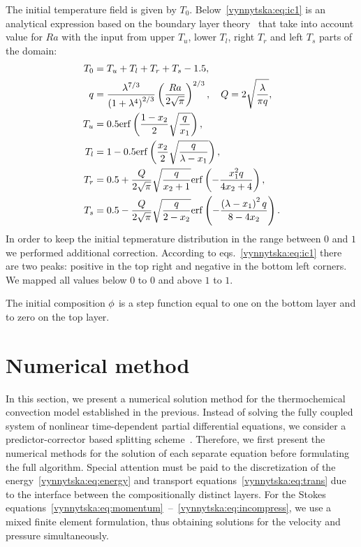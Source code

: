 The initial temperature field is given by $T_0$.
Below~\eqref{vynnytska:eq:ic1} is an analytical expression based on
the boundary layer theory~\citep{KekenEtAl1997} that take into account
value for $Ra$ with the input from upper $T_u$, lower $T_l$, right
$T_r$ and left $T_s$ parts of the domain:
\begin{subequations}
  \label{vynnytska:eq:ic1}
  \begin{align}
    T_0 &= T_u + T_l + T_r + T_s - 1.5, \\
    q &= \frac{\lambda^{7/3}}{\left(1 + \lambda^4 \right)^{2/3}} \left( \frac{Ra}{2 \sqrt{\pi}}\right)^{2/3}, \quad Q  = 2\sqrt{\frac{\lambda}{\pi q}},   \\
    T_u &= 0.5 \mathrm{erf} \left( \frac{1-x_2}{2} \sqrt{\frac{q}{x_1}  } \right), \\
    T_l &= 1 - 0.5 \mathrm{erf} \left( \frac{x_2}{2} \sqrt{\frac{q}{\lambda - x_1}  } \right), \\
    T_r &= 0.5 + \frac{Q}{2\sqrt{\pi}} \sqrt{\frac{q}{x_{2} + 1} } \mathrm{erf} \left( - \frac{x_1^2 q}{4 x_2 + 4} \right), \\
    T_s &= 0.5 - \frac{Q}{2\sqrt{\pi}} \sqrt{\frac{q}{2 - x_{2}} } \mathrm{erf} \left( - \frac{ \left(\lambda - x_1 \right)^2  q}{8 - 4 x_2} \right).
  \end{align}
\end{subequations}
In order to keep the initial tepmerature distribution in the range
between $0$ and $1$ we performed additional correction. According to
eqs.~\eqref{vynnytska:eq:ic1} there are two peaks: positive in the top
right and negative in the bottom left corners.  We mapped all values
below $0$ to $0$ and above $1$ to $1$.

The initial composition $\phi$ is a step function equal to one
on the bottom layer and to zero on the top layer.


\section{Numerical method}
In this section, we present a numerical solution method for the
thermochemical convection model established in the previous. Instead
of solving the fully coupled system of nonlinear time-dependent
partial differential equations, we consider a predictor-corrector
based splitting scheme~\citep{BergKekenYuen1993,
  HansenEbel1988}. Therefore, we first present the numerical methods
for the solution of each separate equation before formulating the full
algorithm. Special attention must be paid to the discretization of the
energy~\eqref{vynnytska:eq:energy} and transport
equations~\eqref{vynnytska:eq:trans} due to the interface between the
compositionally distinct layers. For the Stokes
equations~\eqref{vynnytska:eq:momentum}~--~\eqref{vynnytska:eq:incompress},
we use a mixed finite element formulation, thus obtaining solutions
for the velocity and pressure simultaneously.

